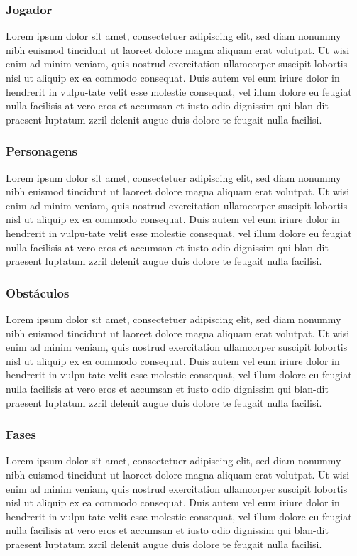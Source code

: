 \subsubsection{Jogador}
\label{secao:jogador}
Lorem ipsum dolor sit amet, consectetuer adipiscing elit, sed diam nonummy nibh euismod tincidunt ut laoreet dolore magna aliquam erat volutpat. Ut wisi enim ad minim veniam, quis nostrud exercitation ullamcorper suscipit lobortis nisl ut aliquip ex ea commodo consequat. Duis autem vel eum iriure dolor in hendrerit in vulpu-tate velit esse molestie consequat, vel illum dolore eu feugiat nulla facilisis at vero eros et accumsan et iusto odio dignissim qui blan-dit praesent luptatum zzril delenit augue duis dolore te feugait nulla facilisi.

\subsubsection{Personagens}
\label{secao:personagens}
Lorem ipsum dolor sit amet, consectetuer adipiscing elit, sed diam nonummy nibh euismod tincidunt ut laoreet dolore magna aliquam erat volutpat. Ut wisi enim ad minim veniam, quis nostrud exercitation ullamcorper suscipit lobortis nisl ut aliquip ex ea commodo consequat. Duis autem vel eum iriure dolor in hendrerit in vulpu-tate velit esse molestie consequat, vel illum dolore eu feugiat nulla facilisis at vero eros et accumsan et iusto odio dignissim qui blan-dit praesent luptatum zzril delenit augue duis dolore te feugait nulla facilisi.

\subsubsection{Obstáculos}
\label{secao:obstaculos}
Lorem ipsum dolor sit amet, consectetuer adipiscing elit, sed diam nonummy nibh euismod tincidunt ut laoreet dolore magna aliquam erat volutpat. Ut wisi enim ad minim veniam, quis nostrud exercitation ullamcorper suscipit lobortis nisl ut aliquip ex ea commodo consequat. Duis autem vel eum iriure dolor in hendrerit in vulpu-tate velit esse molestie consequat, vel illum dolore eu feugiat nulla facilisis at vero eros et accumsan et iusto odio dignissim qui blan-dit praesent luptatum zzril delenit augue duis dolore te feugait nulla facilisi.

\subsubsection{Fases}
\label{secao:fases}
Lorem ipsum dolor sit amet, consectetuer adipiscing elit, sed diam nonummy nibh euismod tincidunt ut laoreet dolore magna aliquam erat volutpat. Ut wisi enim ad minim veniam, quis nostrud exercitation ullamcorper suscipit lobortis nisl ut aliquip ex ea commodo consequat. Duis autem vel eum iriure dolor in hendrerit in vulpu-tate velit esse molestie consequat, vel illum dolore eu feugiat nulla facilisis at vero eros et accumsan et iusto odio dignissim qui blan-dit praesent luptatum zzril delenit augue duis dolore te feugait nulla facilisi.

